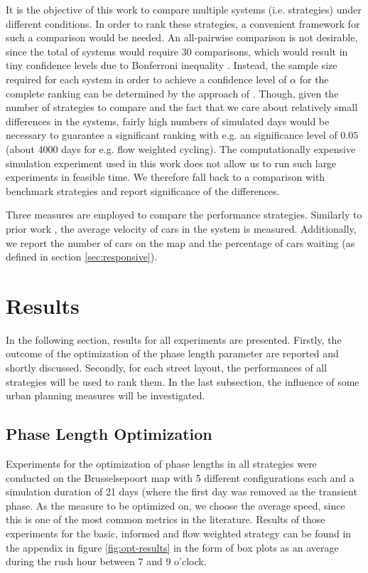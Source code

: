 \documentclass[11pt]{article}
\begin{document}
It is the objective of this work to compare multiple systems (i.e. strategies) under different conditions. In order to rank these strategies, a convenient framework for such a comparison would be needed. An all-pairwise comparison is not desirable, since the total of  systems would require 30 comparisons, which would result in tiny confidence levels due to Bonferroni inequality \citep[see e.g.][]{law2007simulation}. Instead, the sample size required for each system in order to achieve a confidence level of $\alpha$ for the complete ranking can be determined by the approach of \citet{dudewicz1975allocation}. Though, given the number of strategies to compare and the fact that we care about relatively small differences in the systems, fairly high numbers of simulated days would be necessary to guarantee a significant ranking with e.g. an significance level of $0.05$ (about 4000 days for e.g. flow weighted cycling). The computationally expensive simulation experiment used in this work does not allow us to run such large experiments in feasible time. We therefore fall back to a comparison with benchmark strategies and report significance of the differences.

Three measures are employed to compare the performance strategies. Similarly to prior work \citep{srinivasan2006neural}, the average velocity of cars in the system is measured. Additionally, we report the number of cars on the map and the percentage of cars waiting (as defined in section \ref{sec:responsive}).

\section{Results}
\label{sec:results}
In the following section, results for all experiments are presented. Firstly, the outcome of the optimization of the phase length parameter are reported and shortly discussed. Secondly, for each street layout, the performances of all strategies will be used to rank them. In the last subsection, the influence of some urban planning measures will be investigated.

\subsection{Phase Length Optimization}
Experiments for the optimization of phase lengths in all strategies were conducted on the Brusselsepoort map with 5 different configurations each and a simulation duration of 21 days (where the first day was removed as the transient phase. As the measure to be optimized on, we choose the average speed, since this is one of the most common metrics in the literature. Results of those experiments for the basic, informed and flow weighted strategy can be found in the appendix in figure \ref{fig:opt-results} in the form of box plots as an average during the rush hour between 7 and 9 o'clock.
\end{document}
